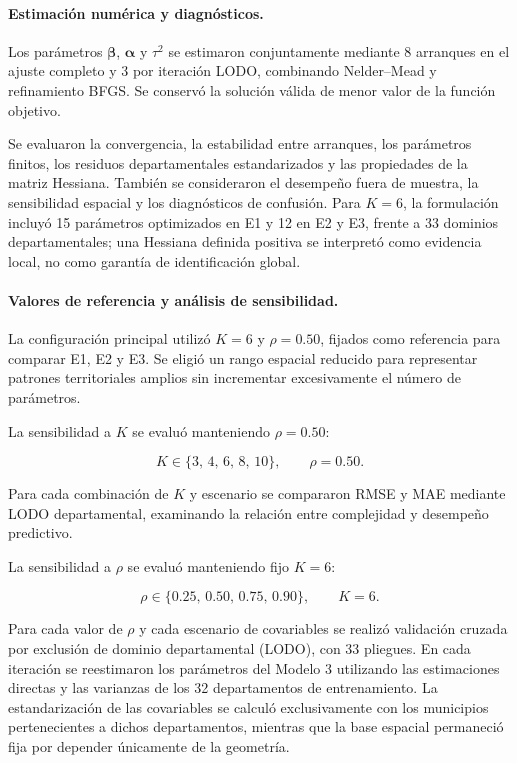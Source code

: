 \paragraph{Estimación numérica y diagnósticos.}

Los parámetros $\boldsymbol{\beta}$, $\boldsymbol{\alpha}$ y $\tau^2$ se estimaron conjuntamente mediante 8 arranques en el ajuste completo y 3 por iteración LODO, combinando Nelder--Mead y refinamiento BFGS. Se conservó la solución válida de menor valor de la función objetivo.

Se evaluaron la convergencia, la estabilidad entre arranques, los parámetros finitos, los residuos departamentales estandarizados y las propiedades de la matriz Hessiana. También se consideraron el desempeño fuera de muestra, la sensibilidad espacial y los diagnósticos de confusión. Para $K=6$, la formulación incluyó 15 parámetros optimizados en E1 y 12 en E2 y E3, frente a 33 dominios departamentales; una Hessiana definida positiva se interpretó como evidencia local, no como garantía de identificación global.

\paragraph{Valores de referencia y análisis de sensibilidad.}

La configuración principal utilizó $K=6$ y $\rho=0.50$, fijados como referencia para comparar E1, E2 y E3. Se eligió un rango espacial reducido para representar patrones territoriales amplios sin incrementar excesivamente el número de parámetros.

La sensibilidad a $K$ se evaluó manteniendo $\rho=0.50$:

\begin{equation}
K \in \{3,\,4,\,6,\,8,\,10\},
\qquad \rho=0.50.
\label{eq:sensibilidad-k}
\end{equation}

Para cada combinación de $K$ y escenario se compararon RMSE y MAE mediante LODO departamental, examinando la relación entre complejidad y desempeño predictivo.

La sensibilidad a $\rho$ se evaluó manteniendo fijo $K=6$:

\begin{equation}
\rho \in \{0.25,\,0.50,\,0.75,\,0.90\},
\qquad K=6.
\label{eq:sensibilidad-rho}
\end{equation}

Para cada valor de $\rho$ y cada escenario de covariables se realizó validación cruzada por exclusión de dominio departamental (LODO), con 33 pliegues. En cada iteración se reestimaron los parámetros del Modelo 3 utilizando las estimaciones directas y las varianzas de los 32 departamentos de entrenamiento. La estandarización de las covariables se calculó exclusivamente con los municipios pertenecientes a dichos departamentos, mientras que la base espacial permaneció fija por depender únicamente de la geometría.

